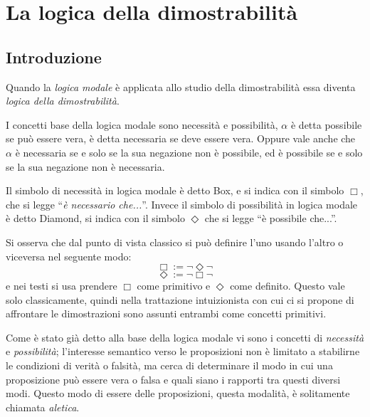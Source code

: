 \newcommand{\TT}{Thm} %
\newcommand{\T}{TH} %
\newcommand{\numg}[1]{\ulcorner{#1}\urcorner}
\newcommand{\TTnumg}[1]{Thm(\ulcorner{#1}\urcorner)} %
\newcommand{\Tnumg}[1]{TH(\ulcorner{#1}\urcorner)}	%

\chapter{La logica della dimostrabilità}

\section{Introduzione}

Quando la \textit{logica modale} \`e applicata allo studio della dimostrabilità essa diventa 
\textit{logica della dimostrabilità}.

I concetti base della logica modale sono necessità e possibilità,
$\alpha$ \`e detta possibile se può essere vera,
\`e detta necessaria se deve essere vera.
Oppure vale anche che $\alpha$ \`e necessaria se e solo se la sua negazione non \`e possibile,
ed \`e possibile se e solo se la sua negazione non \`e necessaria.

Il simbolo di necessità in logica modale \`e detto Box, e si indica con il simbolo $\Box$, che si legge
"`\textit{\`e necessario che...}"'. 
Invece il simbolo di possibilità in logica modale \`e detto Diamond,
si indica con il simbolo $\Diamond$ che si legge "`\`e possibile che..."'.

Si osserva che dal punto di vista classico si può definire l'uno usando l'altro o viceversa 
nel seguente modo:
$$\Box := \neg \Diamond \neg$$
$$\Diamond := \neg \Box \neg$$
e nei testi si usa prendere $\Box$ come primitivo e $\Diamond$ come definito.
Questo vale solo classicamente, quindi nella trattazione intuizionista con cui ci si propone di affrontare le
dimostrazioni sono assunti entrambi come concetti primitivi.

Come \`e stato già detto alla base della logica modale vi sono i concetti di \emph{necessit\`a} e \emph{possibilit\`a}; l'interesse semantico verso le proposizioni non \`e limitato a stabilirne le condizioni di verit\`a o falsit\`a, ma cerca di determinare il modo in cui una proposizione pu\`o essere vera o falsa e quali siano i rapporti tra questi diversi modi. Questo modo di essere delle proposizioni, questa modalit\`a, \`e solitamente chiamata \emph{aletica}.

